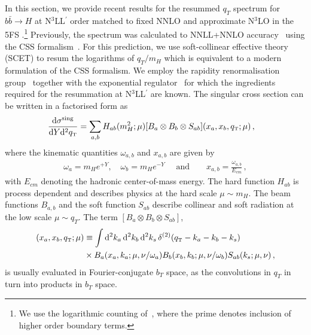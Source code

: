 \documentclass[11pt,a4paper]{article}
\newcommand{\dd}{\mathop{}\!\mathrm{d}}
\begin{document}
In this section, we provide recent results for the resummed $q_T$ spectrum for $b\bar{b}\to H$ at N$^3$LL$^{\prime}$ order matched to fixed NNLO and approximate N$^3$LO in the 5FS \cite{Cal:2023mib}.\footnote{We use the logarithmic counting of~, where the prime denotes inclusion of higher order boundary terms.} Previously, the spectrum was calculated to NNLL+NNLO accuracy~\cite{Harlander:2014hya} using the CSS formalism~\cite{Collins:1981uk,Collins:1981va, Collins:1984kg}. For this prediction, we use soft-collinear effective theory (SCET)
\cite{Bauer:2000yr,Bauer:2001ct,Bauer:2001yt,Bauer:2002nz,Beneke:2002ph} to resum the logarithms of $q_T/m_H$ which is equivalent to a modern formulation of the CSS formalism.
We employ the rapidity
renormalisation group~\cite{Chiu:2012ir} together with the
exponential regulator~\cite{Li:2016axz} for which the ingredients
required for the resummation at N$^3$LL$^{\prime}$ are known.
The singular cross section can be written in a factorised form as
\begin{align} \label{tmd_factorization}
\frac{\mathrm{d} \sigma^\mathrm{sing}}{\mathrm{d} Y \mathrm{d}^2 \qt}
&= \sum_{a,b} H_{ab}(m_H^2; \mu) [B_a\otimes  B_b \otimes S_{ab}]( x_a, x_b, \qt; \mu)
\,,\end{align}
where the kinematic quantities $\omega_{a,b}$ and $x_{a,b}$ are given by
\begin{align}
\omega_{a}=m_H e^{+ Y}, \quad \omega_{b}=m_H e^{-Y} \quad \text{ and} \quad \quad x_{a,b}= \frac{\omega_{a,b}}{E_{cm}}
\,,\end{align}
with $E_{cm}$ denoting the hadronic center-of-mass energy.
The hard function $H_{ab}$ is process dependent and describes physics at the hard scale $\mu\sim m_H$. The beam functions $B_{a,b}$ and the soft function $S_{ab}$ describe collinear and soft radiation at the low scale $\mu \sim q_T$. 
The term $[B_a\otimes  B_b \otimes S_{ab}]$,
\begin{align}
	[B_a\otimes  B_b \otimes S_{ab}]( x_a, x_b, \qt; \mu) &\equiv \int \dd^2 k_a \dd^2 k_b \dd^2 k_s \,\delta^{(2)}(\qt-k_a-k_b-k_s) \nonumber\\
	&\times B_a(x_a,k_a;\mu,\nu/\omega_a) B_b(x_b,k_b;\mu,\nu/\omega_b) S_{ab}(k_s;\mu,\nu)\,,
\end{align}
is usually evaluated in Fourier-conjugate $b_T$ space, as the convolutions in $q_T$ in
 turn into products in $b_T$ space.
\end{document}

